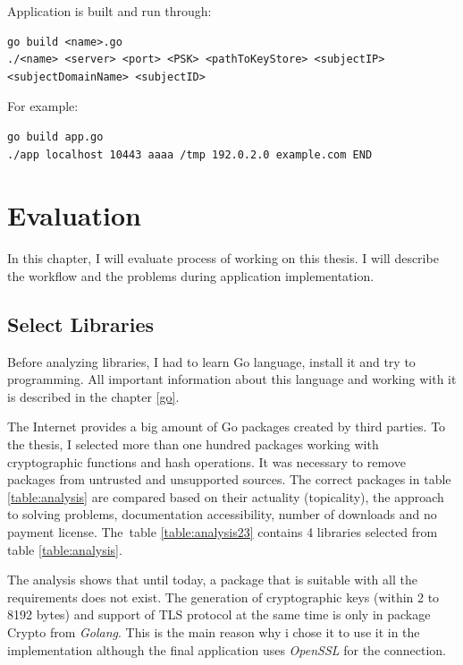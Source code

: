 \documentclass[
  oneside, 12pt, 
  printed, %
  notable,   %
  nolof,     %
  nolot,     %
]{fithesis3}
\begin{document}
Application is built and run through:
\begin{lstlisting}
go build <name>.go
./<name> <server> <port> <PSK> <pathToKeyStore> <subjectIP> <subjectDomainName> <subjectID>
\end{lstlisting}

For example:
\begin{lstlisting}
go build app.go
./app localhost 10443 aaaa /tmp 192.0.2.0 example.com END
\end{lstlisting}

\nocite{linux-man}
\nocite{foundation}

\chapter{Evaluation}

In this chapter, I will evaluate process of working on this thesis. I will describe the workflow and the problems during application implementation.

\section{Select Libraries}
Before analyzing libraries, I had to learn Go language, install it and try to programming. All 
important information about this language and working with it is described in the chapter 
\ref{go}. 

The Internet provides a big amount of Go packages created by third parties. To the thesis, I 
selected more than one hundred packages working with cryptographic functions and hash operations. 
It was necessary to remove packages from untrusted and unsupported sources. The correct packages 
in table \ref{table:analysis} are compared based on their actuality (topicality), the approach to 
solving problems, documentation accessibility, number of downloads and no payment license. The~table \ref{table:analysis23} contains 4 libraries selected from table \ref{table:analysis}. 

The analysis shows that until today, a package that is suitable with all the requirements does not 
exist. The generation of cryptographic keys (within 2 to 8192 bytes) and support of TLS protocol at 
the same time is only in package Crypto from \textit{Golang}. This is the main reason why i chose it to use it in the implementation although the final application uses \textit{OpenSSL} for the connection.
\end{document}

